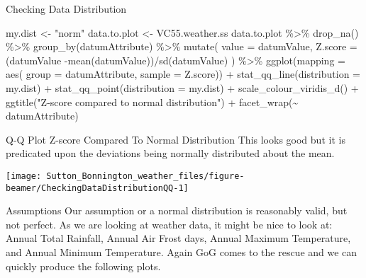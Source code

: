 \documentclass[
  ignorenonframetext,
]{beamer}
\newenvironment{Shaded}{\begin{snugshade}}{\end{snugshade}}
\newcommand{\AttributeTok}[1]{\textcolor[rgb]{0.77,0.63,0.00}{#1}}
\newcommand{\FunctionTok}[1]{\textcolor[rgb]{0.00,0.00,0.00}{#1}}
\newcommand{\NormalTok}[1]{#1}
\newcommand{\OtherTok}[1]{\textcolor[rgb]{0.56,0.35,0.01}{#1}}
\newcommand{\SpecialCharTok}[1]{\textcolor[rgb]{0.00,0.00,0.00}{#1}}
\newcommand{\StringTok}[1]{\textcolor[rgb]{0.31,0.60,0.02}{#1}}
\begin{document}
\begin{frame}[fragile]{Checking Data Distribution}
\protect\hypertarget{checking-data-distribution}{}
\begin{Shaded}
\begin{Highlighting}[]
\NormalTok{my.dist }\OtherTok{\textless{}{-}} \StringTok{"norm"}
\NormalTok{data.to.plot }\OtherTok{\textless{}{-}}\NormalTok{ VC55.weather.ss}
\NormalTok{ data.to.plot }\SpecialCharTok{\%\textgreater{}\%} \FunctionTok{drop\_na}\NormalTok{() }\SpecialCharTok{\%\textgreater{}\%}
  \FunctionTok{group\_by}\NormalTok{(datumAttribute) }\SpecialCharTok{\%\textgreater{}\%} 
  \FunctionTok{mutate}\NormalTok{( }\AttributeTok{value =}\NormalTok{ datumValue,}
      \AttributeTok{Z.score =} 
\NormalTok{        (datumValue }\SpecialCharTok{{-}}\FunctionTok{mean}\NormalTok{(datumValue))}\SpecialCharTok{/}\FunctionTok{sd}\NormalTok{(datumValue)}
\NormalTok{        ) }\SpecialCharTok{\%\textgreater{}\%}
  \FunctionTok{ggplot}\NormalTok{(}\AttributeTok{mapping =} \FunctionTok{aes}\NormalTok{( }
                      \AttributeTok{group =}\NormalTok{ datumAttribute,}
                      \AttributeTok{sample =}\NormalTok{ Z.score)) }\SpecialCharTok{+}
    \FunctionTok{stat\_qq\_line}\NormalTok{(}\AttributeTok{distribution =}\NormalTok{ my.dist) }\SpecialCharTok{+}
   \FunctionTok{stat\_qq\_point}\NormalTok{(}\AttributeTok{distribution =}\NormalTok{ my.dist) }\SpecialCharTok{+} 
  \FunctionTok{scale\_colour\_viridis\_d}\NormalTok{() }\SpecialCharTok{+}
  \FunctionTok{ggtitle}\NormalTok{(}\StringTok{"Z{-}score compared to normal distribution"}\NormalTok{) }\SpecialCharTok{+} 
   \FunctionTok{facet\_wrap}\NormalTok{(}\SpecialCharTok{\textasciitilde{}}\NormalTok{ datumAttribute)}
\end{Highlighting}
\end{Shaded}
\end{frame}

\begin{frame}{Q-Q Plot Z-score Compared To Normal Distribution}
\protect\hypertarget{q-q-plot-z-score-compared-to-normal-distribution}{}
This looks good but it is predicated upon the deviations being normally
distributed about the mean.

\begin{center}\texttt{[image: Sutton\_Bonnington\_weather\_files/figure-beamer/CheckingDataDistributionQQ-1]} \end{center}
\end{frame}

\begin{frame}{Assumptions}
\protect\hypertarget{assumptions}{}
Our assumption or a normal distribution is reasonably valid, but not
perfect. As we are looking at weather data, it might be nice to look at:
Annual Total Rainfall, Annual Air Frost days, Annual Maximum
Temperature, and Annual Minimum Temperature. Again GoG comes to the
rescue and we can quickly produce the following plots.
\end{frame}
\end{document}
